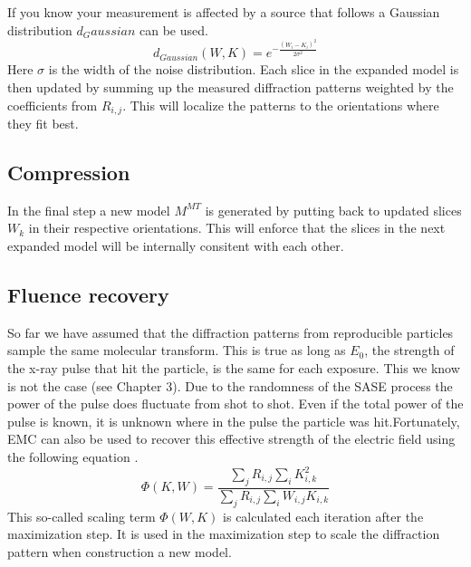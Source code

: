 If you know your measurement is affected by a source that follows a Gaussian distribution $d_Gaussian$ can be used.
\begin{equation}
d_{Gaussian}(W,K) = e^{-\frac{(W_i-K_i)^2}{2\sigma^2}}
\end{equation}
Here $\sigma$ is the width of the noise distribution. Each slice in the expanded model is then updated by summing up the measured diffraction patterns weighted by the coefficients from $R_{i,j}$. This will localize the patterns to the orientations where they fit best.

\subsection{Compression}

In the final step a new model $M^{MT}$ is generated by putting back to updated slices $W_k$ in their respective orientations. This will enforce that the slices in the next expanded model will be internally consitent with each other.

\subsection{Fluence recovery}

So far we have assumed that the diffraction patterns from reproducible particles sample the same molecular transform. This is true as long as $E_0$, the strength of the x-ray pulse that hit the particle, is the same for each exposure. This we know is not the case (see Chapter 3). Due to the randomness of the SASE process the power of the pulse does fluctuate from shot to shot. Even if the total power of the pulse is known, it is unknown where in the pulse the particle was hit.Fortunately, EMC can also be used to recover this effective strength of the electric field using the following equation \cite{Loh2010}.
\begin{equation}
\Phi(K,W) = \frac{\sum_{j} R_{i,j} \sum_{i} K_{i,k}^2 }{\sum_{j} R_{i,j} \sum_{i} W_{i,j} K_{i,k}}
\end{equation}
This so-called scaling term $\Phi(W,K)$ is calculated each iteration after the maximization step. It is used in the maximization step to scale the diffraction pattern when construction a new model.




